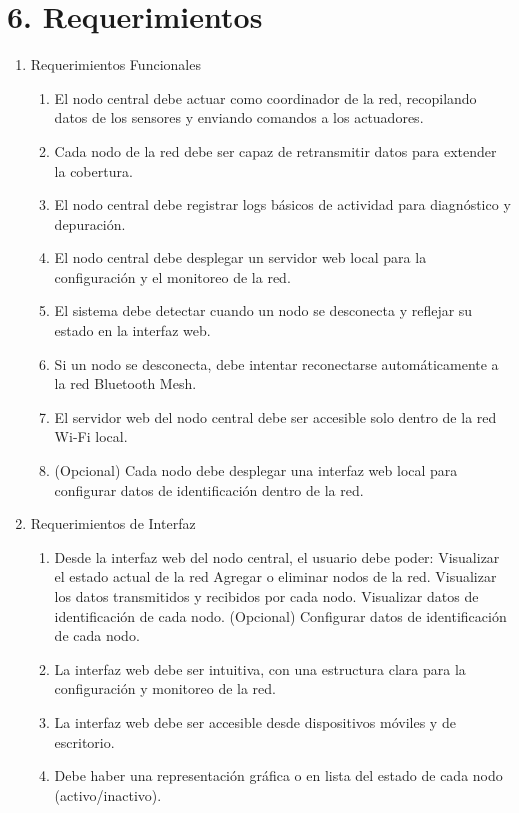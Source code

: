 \documentclass[
11pt, %
]{charter}
\begin{document}
\section{6. Requerimientos}
\label{sec:requerimientos}

\begin{enumerate}
\item Requerimientos Funcionales
	\begin{enumerate}
		\item El nodo central debe actuar como coordinador de la red, recopilando datos de los sensores y enviando comandos a los actuadores.
		\item Cada nodo de la red debe ser capaz de retransmitir datos para extender la cobertura.						\item El nodo central debe registrar logs básicos de actividad para diagnóstico y depuración.
		\item El nodo central debe desplegar un servidor web local para la configuración y el monitoreo de la red. 
		\item El sistema debe detectar cuando un nodo se desconecta y reflejar su estado en la interfaz web.
		\item Si un nodo se desconecta, debe intentar reconectarse automáticamente a la red Bluetooth Mesh.
		\item El servidor web del nodo central debe ser accesible solo dentro de la red Wi-Fi local.
		\item (Opcional) Cada nodo debe desplegar una interfaz web local para configurar datos de identificación dentro de la red. 
	\end{enumerate}

\item Requerimientos de Interfaz
	\begin{enumerate}
		\item Desde la interfaz web del nodo central, el usuario debe poder:
		\subitem Visualizar el estado actual de la red
		\subitem Agregar o eliminar nodos de la red.
		\subitem Visualizar los datos transmitidos y recibidos por cada nodo.
		\subitem Visualizar datos de identificación de cada nodo.
		\subitem (Opcional) Configurar datos de identificación de cada nodo.
	
		\item La interfaz web debe ser intuitiva, con una estructura clara para la configuración y monitoreo de la red.
		\item La interfaz web debe ser accesible desde dispositivos móviles y de escritorio.
		\item Debe haber una representación gráfica o en lista del estado de cada nodo (activo/inactivo).


\end{enumerate}
\end{enumerate}
\end{document}
